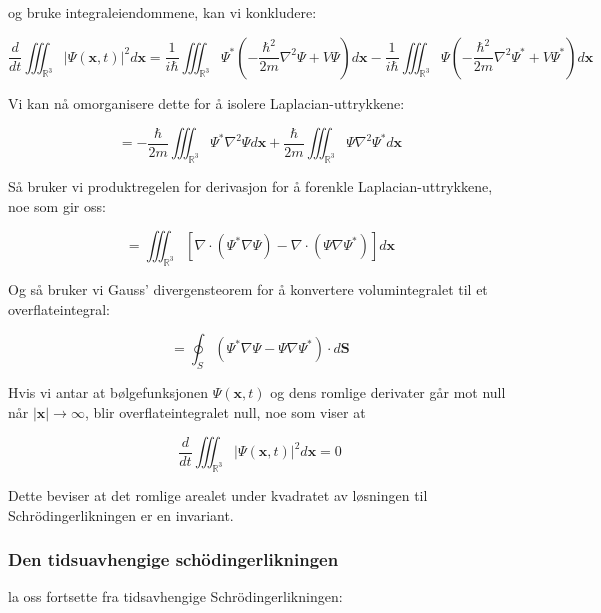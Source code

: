 og bruke integraleiendommene, kan vi konkludere:

\begin{equation*}
    \frac{d}{dt} \iiint_{\mathbb{R}^{3}}|\Psi(\mathbf{x}, t)|^{2} d\mathbf{x} = \frac{1}{i\hbar}\iiint_{\mathbb{R}^{3}} \Psi^* \left(-\frac{\hbar^2}{2m}\nabla^2\Psi + V\Psi\right) d\mathbf{x} - \frac{1}{i\hbar}\iiint_{\mathbb{R}^{3}} \Psi \left(-\frac{\hbar^2}{2m}\nabla^2\Psi^* + V\Psi^*\right) d\mathbf{x}
\end{equation*}
    
Vi kan nå omorganisere dette for å isolere Laplacian-uttrykkene:
    
\begin{equation*}
    = -\frac{\hbar}{2m}\iiint_{\mathbb{R}^{3}} \Psi^* \nabla^2\Psi d\mathbf{x} + \frac{\hbar}{2m}\iiint_{\mathbb{R}^{3}} \Psi \nabla^2\Psi^* d\mathbf{x}
\end{equation*}
    
Så bruker vi produktregelen for derivasjon for å forenkle Laplacian-uttrykkene, noe som gir oss:
    
\begin{equation*}
    = \iiint_{\mathbb{R}^{3}} [\nabla \cdot (\Psi^* \nabla \Psi) - \nabla \cdot (\Psi \nabla \Psi^*)] d\mathbf{x}
\end{equation*}
    
Og så bruker vi Gauss' divergensteorem for å konvertere volumintegralet til et overflateintegral:
    
\begin{equation*}
    = \oint_{S} (\Psi^* \nabla \Psi - \Psi \nabla \Psi^*) \cdot d\mathbf{S}
\end{equation*}
    
Hvis vi antar at bølgefunksjonen $\Psi(\mathbf{x}, t)$ og dens romlige derivater går mot null når $|\mathbf{x}| \to \infty$, blir overflateintegralet null, noe som viser at
    
\begin{equation*}
    \frac{d}{dt} \iiint_{\mathbb{R}^{3}}|\Psi(\mathbf{x}, t)|^{2} d\mathbf{x} = 0
\end{equation*}
    
Dette beviser at det romlige arealet under kvadratet av løsningen til Schrödingerlikningen er en invariant.

\subsubsection*{Den tidsuavhengige schödingerlikningen}
la oss fortsette fra tidsavhengige Schrödingerlikningen:

